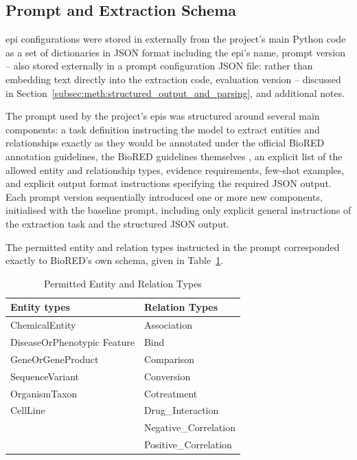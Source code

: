 \subsection{Prompt and Extraction Schema}
\label{subsec:meth:prompt_and_extraction_schema}
\gls{epi} configurations were stored in externally from the project's main Python code as a set of dictionaries in JSON format including the \gls{epi}'s name, prompt version -- also stored externally in a prompt configuration JSON file: rather than embedding text directly into the extraction code, evaluation version -- discussed in Section~\ref{subsec:meth:structured_output_and_parsing}, and additional notes.

The prompt used by the project's \glspl{epi} was structured around several main components: a task definition instructing the model to extract entities and relationships exactly as they would be annotated under the official BioRED annotation guidelines, the BioRED guidelines themselves \cite{luo2022_biored}, an explicit list of the allowed entity and relationship types, evidence requirements, few-shot examples, and explicit output format instructions specifying the required JSON output. Each prompt version sequentially introduced one or more new components, initialised with the baseline prompt, including only explicit general instructions of the extraction task and the structured JSON output.

The permitted entity and relation types instructed in the prompt corresponded exactly to BioRED's own schema, given in Table~\ref{tab:permitted_entity_and_relation_types}.

\pref

\begin{table}[H]
    \centering
    \caption{Permitted Entity and Relation Types}
    \label{tab:permitted_entity_and_relation_types}
    \begin{tabularx}{\textwidth}{l l}
        \toprule
        Entity types & Relation Types \\
        \midrule
        ChemicalEntity & Association \\
        DiseaseOrPhenotypic Feature & Bind \\
        GeneOrGeneProduct & Comparison \\
        SequenceVariant & Conversion \\
        OrganismTaxon & Cotreatment \\
        CellLine & Drug\_Interaction \\
         & Negative\_Correlation \\
         & Positive\_Correlation \\
        \bottomrule
    \end{tabularx}
\end{table}

